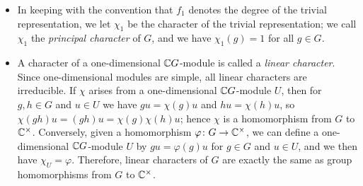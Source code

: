 \documentclass[../Odyssey_Project.tex]{subfiles}
\begin{document}
\begin{itemize}
    \item In keeping with the convention that $f_1$ denotes the degree of the trivial representation, we let $\chi_1$ be the character of the trivial representation; we call $\chi_1$ the \emph{principal character} of $G$, and we have $\chi_1(g) = 1$ for all $g \in G$.
    \item A character of a one-dimensional $\mathbb{C} G$-module is called a \emph{linear character}. Since one-dimensional modules are simple, all linear characters are irreducible. If $\chi$ arises from a one-dimensional $\mathbb{C} G$-module $U$, then for $g, h \in G$ and $u \in U$ we have $gu = \chi(g)u$ and $hu = \chi(h)u$, so $\chi(gh)u = (gh)u = \chi(g)\chi(h)u$; hence $\chi$ is a homomorphism from $G$ to $\mathbb{C}^{\times}$. Conversely, given a homomorphism $\varphi \colon G \to \mathbb{C}^{\times}$, we can define a one-dimensional $\mathbb{C} G$-module $U$ by $gu = \varphi(g) u$ for $g \in G$ and $u \in U$, and we then have $\chi_U = \varphi$. Therefore, linear characters of $G$ are exactly the same as group homomorphisms from $G$ to $\mathbb{C}^{\times}$.
\end{itemize}
\end{document}
